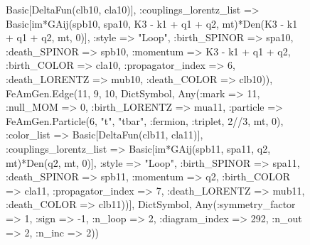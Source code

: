 \documentclass{revtex4}
\begin{document}
\begin{figure}[!htb]
\begin{center}
{Basic[DeltaFun(clb10, cla10)], :couplings_lorentz_list => Basic[im*GAij(spb10, spa10, K3 - k1 + q1 + q2, mt)*Den(K3 - k1 + q1 + q2, mt, 0)], :style => "Loop", :birth_SPINOR => spa10, :death_SPINOR => spb10, :momentum => K3 - k1 + q1 + q2, :birth_COLOR => cla10, :propagator_index => 6, :death_LORENTZ => mub10, :death_COLOR => clb10)), FeAmGen.Edge(11, 9, 10, Dict{Symbol, Any}(:mark => 11, :null_MOM => 0, :birth_LORENTZ => mua11, :particle => FeAmGen.Particle(6, "t", "tbar", :fermion, :triplet, 2//3, mt, 0), :color_list => Basic[DeltaFun(clb11, cla11)], :couplings_lorentz_list => Basic[im*GAij(spb11, spa11, q2, mt)*Den(q2, mt, 0)], :style => "Loop", :birth_SPINOR => spa11, :death_SPINOR => spb11, :momentum => q2, :birth_COLOR => cla11, :propagator_index => 7, :death_LORENTZ => mub11, :death_COLOR => clb11))], Dict{Symbol, Any}(:symmetry_factor => 1, :sign => -1, :n_loop => 2, :diagram_index => 292, :n_out => 2, :n_inc => 2)) 
}
\end{center}
\end{figure}
\end{document}
